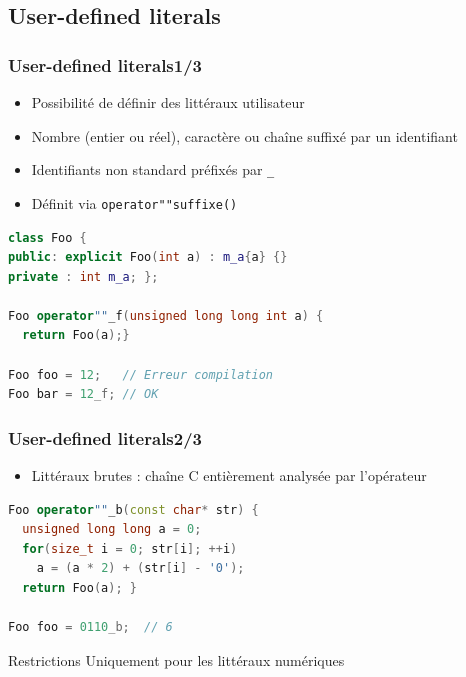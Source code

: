 \documentclass[C++.tex]{subfiles}
\begin{document}
\subsection*{User-defined literals}
\begin{frame}[fragile]
	\frametitle{User-defined literals\titlehfill{}1/3}
	\begin{itemize}
		\item Possibilité de définir des littéraux \og utilisateur\fg{}
		\item Nombre (entier ou réel), caractère ou chaîne suffixé par un identifiant
		\item Identifiants non standard préfixés par \lstinline|_|


		\item Définit via \lstinline|operator""suffixe()|
	\end{itemize}

	\begin{lstlisting}[language=C++]
class Foo {
public: explicit Foo(int a) : m_a{a} {}
private : int m_a; };

Foo operator""_f(unsigned long long int a) {
  return Foo(a);}

Foo foo = 12;   // Erreur compilation
Foo bar = 12_f; // OK\end{lstlisting}

\end{frame}

\begin{frame}[fragile]
	\frametitle{User-defined literals\titlehfill{}2/3}
	\begin{itemize}
		\item Littéraux brutes : chaîne C entièrement analysée par l'opérateur
	\end{itemize}
	
\begin{lstlisting}[language=C++]
Foo operator""_b(const char* str) {
  unsigned long long a = 0;
  for(size_t i = 0; str[i]; ++i)
    a = (a * 2) + (str[i] - '0');
  return Foo(a); }
		
Foo foo = 0110_b;  // 6\end{lstlisting}

	\begin{alertblock}{Restrictions}
		Uniquement pour les littéraux numériques
	\end{alertblock}
\end{frame}
\end{document}
